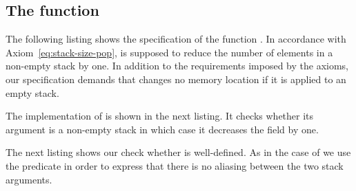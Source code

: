
\subsection{The function \stackpop}

The following listing shows the specification of the function \stackpop.
In accordance with Axiom~\eqref{eq:stack-size-pop}, \stackpop is supposed
to reduce the number of elements in a non-empty stack by one.
In addition to the requirements imposed by the axioms,
our specification demands that \stackpop changes no memory location if it
is applied to an empty stack.



The implementation of \stackpop is shown in the next listing.
It checks whether its argument is a non-empty stack in which case it
decreases the field  by one.



\clearpage

The next listing shows our check whether \stackpop is well-defined.
As in the case of \stackpush we use the predicate 
in order to express that there is no aliasing between the two stack arguments.



